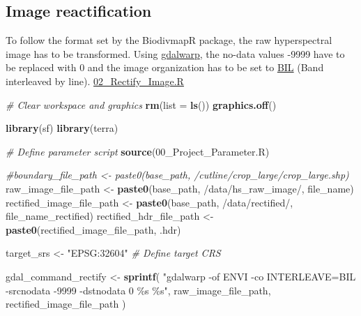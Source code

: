 \documentclass[
]{article}
\newenvironment{Shaded}{\begin{snugshade}}{\end{snugshade}}
\newcommand{\AttributeTok}[1]{\textcolor[rgb]{0.13,0.29,0.53}{#1}}
\newcommand{\CommentTok}[1]{\textcolor[rgb]{0.56,0.35,0.01}{\textit{#1}}}
\newcommand{\FunctionTok}[1]{\textcolor[rgb]{0.13,0.29,0.53}{\textbf{#1}}}
\newcommand{\NormalTok}[1]{#1}
\newcommand{\OtherTok}[1]{\textcolor[rgb]{0.56,0.35,0.01}{#1}}
\newcommand{\StringTok}[1]{\textcolor[rgb]{0.31,0.60,0.02}{#1}}
\begin{document}
\subsection{Image reactification}\label{image-reactification}

To follow the format set by the BiodivmapR package, the raw
hyperspectral image has to be transformed. Using
\href{https://gdal.org/en/latest/programs/gdalwarp.html}{gdalwarp}, the
no-data values -9999 have to be replaced with 0 and the image
organization has to be set to
\href{https://desktop.arcgis.com/en/arcmap/latest/manage-data/raster-and-images/bil-bip-and-bsq-raster-files.htm}{BIL}
(Band interleaved by line).
\href{https://github.com/patrickangst/UWW200_Master_Thesis_public/blob/main/MasterThesisRCode/02_Rectify_Image.R}{02\_Rectify\_Image.R}

\begin{Shaded}
\begin{Highlighting}[]
\CommentTok{\# Clear workspace and graphics}
\FunctionTok{rm}\NormalTok{(}\AttributeTok{list =} \FunctionTok{ls}\NormalTok{())}
\FunctionTok{graphics.off}\NormalTok{()}

\FunctionTok{library}\NormalTok{(sf)}
\FunctionTok{library}\NormalTok{(terra)}

\CommentTok{\# Define parameter script}
\FunctionTok{source}\NormalTok{(}\StringTok{\textquotesingle{}00\_Project\_Parameter.R\textquotesingle{}}\NormalTok{)}

\CommentTok{\#boundary\_file\_path \textless{}{-} paste0(base\_path, \textquotesingle{}/cutline/crop\_large/crop\_large.shp\textquotesingle{})}
\NormalTok{raw\_image\_file\_path }\OtherTok{\textless{}{-}} \FunctionTok{paste0}\NormalTok{(base\_path, }\StringTok{\textquotesingle{}/data/hs\_raw\_image/\textquotesingle{}}\NormalTok{, file\_name)}
\NormalTok{rectified\_image\_file\_path }\OtherTok{\textless{}{-}} \FunctionTok{paste0}\NormalTok{(base\_path, }\StringTok{\textquotesingle{}/data/rectified/\textquotesingle{}}\NormalTok{, file\_name\_rectified)}
\NormalTok{rectified\_hdr\_file\_path }\OtherTok{\textless{}{-}} \FunctionTok{paste0}\NormalTok{(rectified\_image\_file\_path, }\StringTok{\textquotesingle{}.hdr\textquotesingle{}}\NormalTok{)}

\NormalTok{target\_srs }\OtherTok{\textless{}{-}} \StringTok{"EPSG:32604"}  \CommentTok{\# Define target CRS}

\NormalTok{gdal\_command\_rectify }\OtherTok{\textless{}{-}} \FunctionTok{sprintf}\NormalTok{(}
  \StringTok{"gdalwarp {-}of ENVI {-}co INTERLEAVE=BIL {-}srcnodata {-}9999 {-}dstnodata 0 \%s \%s"}\NormalTok{,}
\NormalTok{  raw\_image\_file\_path,}
\NormalTok{  rectified\_image\_file\_path}
\NormalTok{)}


\end{Highlighting}
\end{Shaded}
\end{document}
